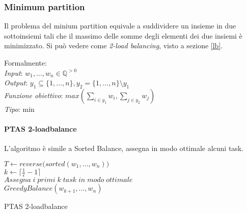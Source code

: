 \subsubsection{Minimum partition}
Il problema del minium partition equivale a suddividere un insieme in due sottoinsiemi 
tali che il massimo delle somme degli elementi dei due insiemi è minimizzato.
Si può vedere come \emph{2-load balancing}, visto a sezione \ref{lb}.

Formalmente:\\
\emph{Input}: $w_1, \dots, w_n \in \mathbb{Q}^{>0}$\\
\emph{Output}: $y_1 \subseteq \{1,\dots , n \},  y_2 = \{1,\dots , n \} \setminus y_1$\\
\emph{Funzione obiettivo}: $max(\sum_{i\in y_1}w_i, \sum_{j\in y_2}w_j)$\\
\emph{Tipo}: min

\paragraph{PTAS 2-loadbalance}
L'algoritmo è simile a Sorted Balance, assegna in modo ottimale 
alcuni task.

\begin{algorithm}[H]
    \SetAlgoLined
     $T \gets \mathit{reverse(sorted}(w_1, \dots, w_n))$\\
     $k \gets \lceil \frac{1}{\epsilon} - 1 \rceil$\\
    $\mathit{Assegna\;}\mathit{i\;}\mathit{primi\;}\mathit{k\;}\mathit{task\;}\mathit{in\;}\mathit{modo\;}\mathit{ottimale\;}$\\
    $\mathit{GreedyBalance}(w_{k+1}, \dots, w_n)$\\
     \caption{PTAS 2-loadbalance}
\end{algorithm}

